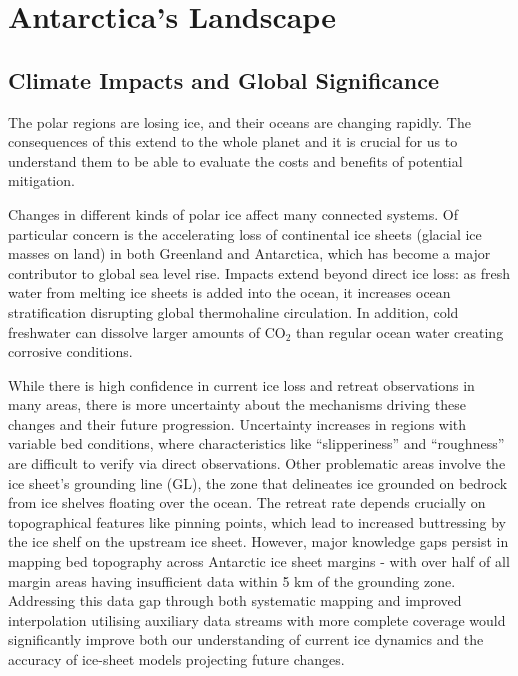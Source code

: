 \chapter{Antarctica's Landscape}\label{why}
\section{Climate Impacts and Global Significance}

The polar regions are losing ice, and their oceans are changing rapidly\cite{O_C_in_changingClimate}. The consequences of this extend to the whole planet and it is crucial for us to understand them to be able to evaluate the costs and benefits of potential mitigation. 

Changes in different kinds of polar ice affect many connected systems. Of particular concern is the accelerating loss of continental ice sheets (glacial ice masses on land) in both Greenland and Antarctica, which has become a major contributor to global sea level rise\cite{O_C_in_changingClimate}. Impacts extend beyond direct ice loss: as fresh water from melting ice sheets is added into the ocean, it increases ocean stratification disrupting global thermohaline circulation\cite{Jacobs_2004}. In addition, cold freshwater can dissolve larger amounts of $\mathrm{CO_2}$ than regular ocean water creating corrosive conditions\cite{O_C_in_changingClimate}.
 
While there is high confidence in current ice loss and retreat observations in many areas, there is more uncertainty about the mechanisms driving these changes and their future progression\cite{Fox-Kemper_2021}. Uncertainty increases in regions with variable bed conditions, where characteristics like ``slipperiness'' and ``roughness'' are difficult to verify via direct observations. Other problematic areas involve the ice sheet's grounding line (GL), the zone that delineates ice grounded on bedrock from ice shelves floating over the ocean. The retreat rate depends crucially on topographical features like pinning points\cite{Fox-Kemper_2021}, which lead to increased buttressing by the ice shelf on the upstream ice sheet. However, major knowledge gaps persist in mapping bed topography across Antarctic ice sheet margins - with over half of all margin areas having insufficient data within 5 km of the grounding zone\cite{RINGS_2022}. Addressing this data gap through both systematic mapping and improved interpolation utilising auxiliary data streams with more complete coverage would significantly improve both our understanding of current ice dynamics and the accuracy of ice-sheet models projecting future changes.

